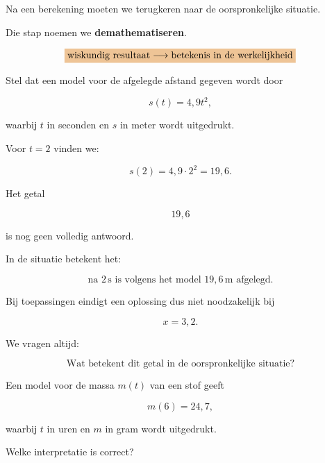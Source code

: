 \documentclass{ximera}
\begin{document}
Na een berekening moeten we terugkeren naar de oorspronkelijke
situatie.

Die stap noemen we \textbf{demathematiseren}.

\[
\important{
\text{wiskundig resultaat}
\longrightarrow
\text{betekenis in de werkelijkheid}
}
\]

\begin{voorbeeld}

Stel dat een model voor de afgelegde afstand gegeven wordt door

\[
s(t)=4{,}9t^2,
\]

waarbij $t$ in seconden en $s$ in meter wordt uitgedrukt.

Voor $t=2$ vinden we:

\[
s(2)=4{,}9\cdot2^2=19{,}6.
\]

Het getal

\[
19{,}6
\]

is nog geen volledig antwoord.

In de situatie betekent het:

\[
\boxed{
\text{na }2\,\mathrm s\text{ is volgens het model }19{,}6\,\mathrm m
\text{ afgelegd.}
}
\]

\end{voorbeeld}


\begin{opmerking}
Bij toepassingen eindigt een oplossing dus niet noodzakelijk bij

\[
x=3{,}2.
\]

We vragen altijd:

\[
\boxed{\text{Wat betekent dit getal in de oorspronkelijke situatie?}}
\]
\end{opmerking}


\begin{oefening}{\oefB \ESS}

Een model voor de massa $m(t)$ van een stof geeft

\[
m(6)=24{,}7,
\]

waarbij $t$ in uren en $m$ in gram wordt uitgedrukt.

Welke interpretatie is correct?

\begin{multipleChoice}
\end{multipleChoice}

\end{oefening}
\end{document}
